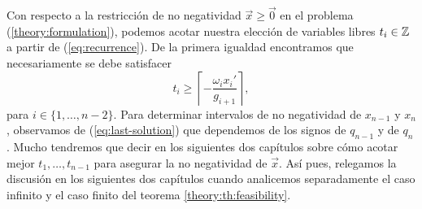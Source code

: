 Con respecto a la restricción de no negatividad $\vec{x} \geq \vec{0}$ en el problema
(\ref{theory:formulation}), podemos acotar nuestra elección de variables libres $t_i \in \mathbb{Z}$ a
partir de (\ref{eq:recurrence}). De la primera igualdad encontramos que necesariamente se debe
satisfacer
\begin{equation}
	\label{eq:param-lb}
	t_i \geq \left\lceil -\frac{\omega_ix_i'}{g_{i + 1}} \right\rceil,
\end{equation}
para $i \in \lbrace 1, \ldots, n - 2\rbrace$. Para determinar intervalos de no negatividad de
$x_{n-1}$ y $x_n$, observamos de (\ref{eq:last-solution}) que dependemos de los signos
de $q_{n-1}$ y de $q_n$. Mucho tendremos que decir en los siguientes dos capítulos sobre
cómo acotar mejor $t_1, \ldots, t_{n-1}$ para asegurar la no negatividad de $\vec{x}$. Así pues,
relegamos la discusión en los siguientes dos capítulos cuando analicemos separadamente el caso
infinito y el caso finito del teorema \ref{theory:th:feasibility}.

